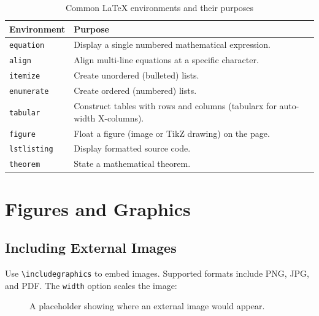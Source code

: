 \documentclass[12pt, a4paper]{article}
\theoremstyle{definition}
\theoremstyle{plain}
\theoremstyle{remark}
\begin{document}
\begin{table}[H]
  \centering
  \caption{Common \LaTeX{} environments and their purposes}
  \label{tab:tabularx}
  \begin{tabularx}{\textwidth}{lX}          %
    \toprule
    \textbf{Environment}   & \textbf{Purpose}                             \\
    \midrule
    \texttt{equation}      & Display a single numbered mathematical expression.     \\
    \texttt{align}         & Align multi-line equations at a specific character.    \\
    \texttt{itemize}       & Create unordered (bulleted) lists.                     \\
    \texttt{enumerate}     & Create ordered (numbered) lists.                       \\
    \texttt{tabular}       & Construct tables with rows and columns (tabularx for auto-width X-columns). \\
    \texttt{figure}        & Float a figure (image or TikZ drawing) on the page.   \\
    \texttt{lstlisting}    & Display formatted source code.                         \\
    \texttt{theorem}       & State a mathematical theorem.                          \\
    \bottomrule
  \end{tabularx}
\end{table}


\section{Figures and Graphics}
\label{sec:figures}

\subsection{Including External Images}

Use \verb|\includegraphics| to embed images.  Supported formats include
PNG, JPG, and PDF.  The \texttt{width} option scales the image:

\begin{figure}[H]
  \centering
  \caption{A placeholder showing where an external image would appear.}
  \label{fig:placeholder}
\end{figure}
\end{document}

